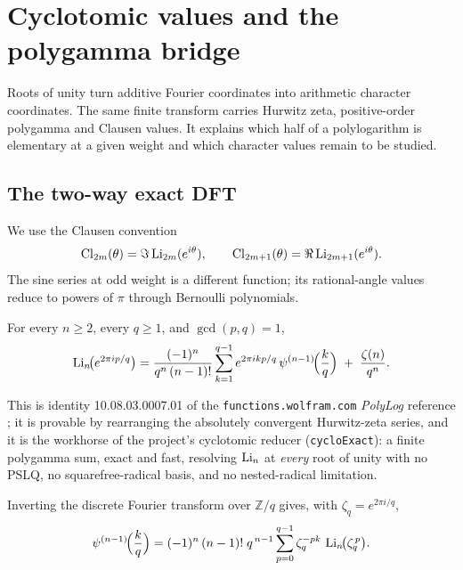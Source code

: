 \chapter{Cyclotomic values and the polygamma bridge}
\label{ch:02-cyclotomic}

Roots of unity turn additive Fourier coordinates into arithmetic character
coordinates. The same finite transform carries Hurwitz zeta, positive-order
polygamma and Clausen values. It explains which half of a polylogarithm is
elementary at a given weight and which character values remain to be studied.

\section{The two-way exact DFT}\label{bridge:sec:dft}

We use the Clausen convention
\[
\operatorname{Cl}_{2m}(\theta)=\Im\operatorname{Li}_{2m}(e^{i\theta}),\qquad
\operatorname{Cl}_{2m+1}(\theta)=\Re\operatorname{Li}_{2m+1}(e^{i\theta}).
\]
The sine series at odd weight is a different function; its rational-angle
values reduce to powers of $\pi$ through Bernoulli polynomials.

\begin{law}\label{bridge:law:forward}
For every $n\ge2$, every $q\ge1$, and $\gcd(p,q)=1$,
\[
\operatorname{Li}_n\!\bigl(e^{2\pi ip/q}\bigr)
=\frac{(-1)^n}{q^n\,(n-1)!}\sum_{k=1}^{q-1}e^{2\pi ikp/q}\,
\psi^{(n-1)}\!\Bigl(\frac{k}{q}\Bigr)\;+\;\frac{\zeta(n)}{q^n}.
\]
\end{law}

This is identity 10.08.03.0007.01 of the \texttt{functions.wolfram.com} \emph{PolyLog}
reference \cite{bridge:WolframFunctions}; it is provable by rearranging the absolutely convergent Hurwitz-zeta series, and
it is the workhorse of the project's cyclotomic reducer (\texttt{cycloExact}): a finite
polygamma sum, exact and fast, resolving $\operatorname{Li}_n$ at \emph{every} root of unity with no
PSLQ, no squarefree-radical basis, and no nested-radical limitation.

\begin{result}\label{bridge:res:inverse}
Inverting the discrete Fourier transform over $\mathbb{Z}/q$ gives, with
$\zeta_q=e^{2\pi i/q}$,
\[
\psi^{(n-1)}\!\Bigl(\frac{k}{q}\Bigr)
=(-1)^n\,(n-1)!\;q^{\,n-1}\sum_{p=0}^{q-1}\zeta_q^{-pk}\,\operatorname{Li}_n\!\bigl(\zeta_q^{\,p}\bigr).
\]
\end{result}


